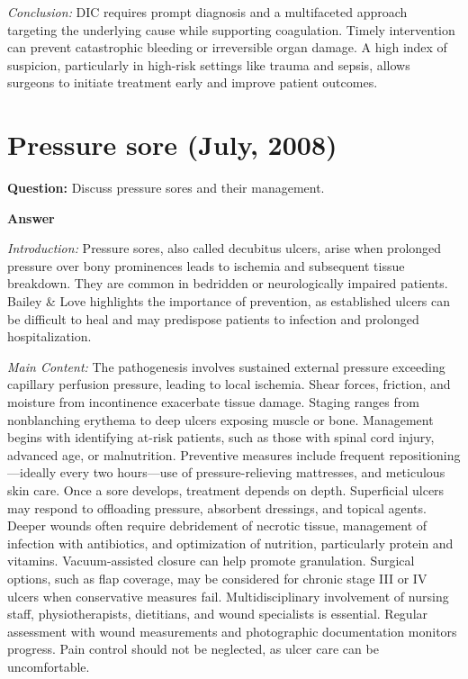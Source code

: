 \documentclass{article}
\begin{document}
\emph{Conclusion:} DIC requires prompt diagnosis and a multifaceted approach targeting the underlying cause while supporting coagulation. Timely intervention can prevent catastrophic bleeding or irreversible organ damage. A high index of suspicion, particularly in high-risk settings like trauma and sepsis, allows surgeons to initiate treatment early and improve patient outcomes.


\section{Pressure sore (July, 2008)}


\textbf{Question:} Discuss pressure sores and their management.

\textbf{Answer}

\emph{Introduction:} Pressure sores, also called decubitus ulcers, arise when prolonged pressure over bony prominences leads to ischemia and subsequent tissue breakdown. They are common in bedridden or neurologically impaired patients. Bailey \& Love highlights the importance of prevention, as established ulcers can be difficult to heal and may predispose patients to infection and prolonged hospitalization.

\emph{Main Content:} The pathogenesis involves sustained external pressure exceeding capillary perfusion pressure, leading to local ischemia. Shear forces, friction, and moisture from incontinence exacerbate tissue damage. Staging ranges from nonblanching erythema to deep ulcers exposing muscle or bone. Management begins with identifying at-risk patients, such as those with spinal cord injury, advanced age, or malnutrition. Preventive measures include frequent repositioning—ideally every two hours—use of pressure-relieving mattresses, and meticulous skin care. Once a sore develops, treatment depends on depth. Superficial ulcers may respond to offloading pressure, absorbent dressings, and topical agents. Deeper wounds often require debridement of necrotic tissue, management of infection with antibiotics, and optimization of nutrition, particularly protein and vitamins. Vacuum-assisted closure can help promote granulation. Surgical options, such as flap coverage, may be considered for chronic stage III or IV ulcers when conservative measures fail. Multidisciplinary involvement of nursing staff, physiotherapists, dietitians, and wound specialists is essential. Regular assessment with wound measurements and photographic documentation monitors progress. Pain control should not be neglected, as ulcer care can be uncomfortable.
\end{document}
